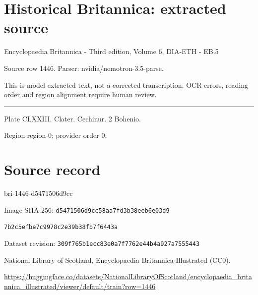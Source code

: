\documentclass[11pt]{article}
\begin{document}
\section*{Historical Britannica: extracted source}
Encyclopaedia Britannica - Third edition, Volume 6, DIA-ETH - EB.5\par
{\small Source row 1446. Parser: nvidia/nemotron-3.5-parse.\par}
{\small This is model-extracted text, not a corrected transcription. OCR errors, reading order and region alignment require human review.\par}
\hrule\medskip
Plate CLXXIII.
Clater.
Cechinur. 2
Bohenio.
\par

{\scriptsize\color{gray} Region region-0; provider order 0.\par}
\medskip
\newpage\section*{Source record}
bri-1446-d5471506d9cc\par
Image SHA-256: \texttt{d5471506d9cc58aa7fd3b38eeb6e03d9}\par\texttt{7b2c5efbe7c9978c2e39b38fb7f6443a}\par
Dataset revision: \texttt{309f765b1ecc83e0a7f7}\texttt{762e44b4a927a7555443}\par
National Library of Scotland, Encyclopaedia Britannica Illustrated (CC0).\par
\url{https://huggingface.co/datasets/NationalLibraryOfScotland/encyclopaedia_britannica_illustrated/viewer/default/train?row=1446}
\end{document}
